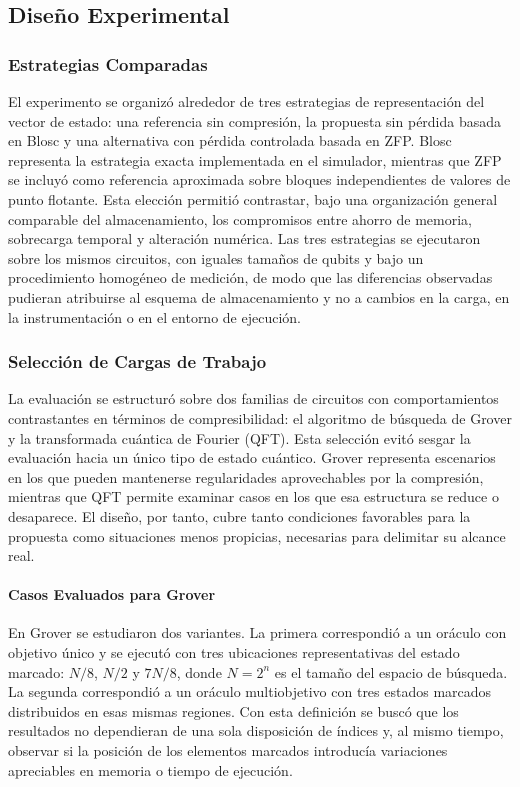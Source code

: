 \subsection{Diseño Experimental}

\subsubsection{Estrategias Comparadas}

El experimento se organizó alrededor de tres estrategias de representación del vector de estado: una referencia sin compresión, la propuesta sin pérdida basada en Blosc y una alternativa con pérdida controlada basada en ZFP. Blosc representa la estrategia exacta implementada en el simulador, mientras que ZFP se incluyó como referencia aproximada sobre bloques independientes de valores de punto flotante. Esta elección permitió contrastar, bajo una organización general comparable del almacenamiento, los compromisos entre ahorro de memoria, sobrecarga temporal y alteración numérica. Las tres estrategias se ejecutaron sobre los mismos circuitos, con iguales tamaños de qubits y bajo un procedimiento homogéneo de medición, de modo que las diferencias observadas pudieran atribuirse al esquema de almacenamiento y no a cambios en la carga, en la instrumentación o en el entorno de ejecución.

\subsubsection{Selección de Cargas de Trabajo}

La evaluación se estructuró sobre dos familias de circuitos con comportamientos contrastantes en términos de compresibilidad: el algoritmo de búsqueda de Grover y la transformada cuántica de Fourier (QFT). Esta selección evitó sesgar la evaluación hacia un único tipo de estado cuántico. Grover representa escenarios en los que pueden mantenerse regularidades aprovechables por la compresión, mientras que QFT permite examinar casos en los que esa estructura se reduce o desaparece. El diseño, por tanto, cubre tanto condiciones favorables para la propuesta como situaciones menos propicias, necesarias para delimitar su alcance real.

\paragraph{Casos Evaluados para Grover} En Grover se estudiaron dos variantes. La primera correspondió a un oráculo con objetivo único y se ejecutó con tres ubicaciones representativas del estado marcado: $N/8$, $N/2$ y $7N/8$, donde $N = 2^n$ es el tamaño del espacio de búsqueda. La segunda correspondió a un oráculo multiobjetivo con tres estados marcados distribuidos en esas mismas regiones. Con esta definición se buscó que los resultados no dependieran de una sola disposición de índices y, al mismo tiempo, observar si la posición de los elementos marcados introducía variaciones apreciables en memoria o tiempo de ejecución.

